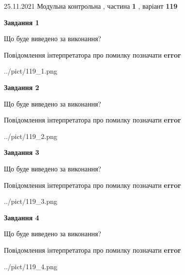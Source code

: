 \documentclass[10pt, ukrainian]{article}
\begin{document}
{25.11.2021 Модульна контрольна , частина \textbf { 1 }, варіант  \No \textbf { 119 }\par}
{
\begin {large}

{\begin {center}\textbf{Завдання 1}\end {center}}\par
Що буде виведено за виконання? \par
Повідомлення інтерпретатора про помилку позначати \textbf{error}

\begin{center}
	{../pict/119_1.png}
\end{center}
\newpage

{\begin {center}\textbf{Завдання 2}\end {center}}\par
Що буде виведено за виконання? \par
Повідомлення інтерпретатора про помилку позначати \textbf{error}

\begin{center}
	{../pict/119_2.png}
\end{center}
\newpage

{\begin {center}\textbf{Завдання 3}\end {center}}\par
Що буде виведено за виконання? \par
Повідомлення інтерпретатора про помилку позначати \textbf{error}

\begin{center}
	{../pict/119_3.png}
\end{center}
\newpage

{\begin {center}\textbf{Завдання 4}\end {center}}\par
Що буде виведено за виконання? \par
Повідомлення інтерпретатора про помилку позначати \textbf{error}

\begin{center}
	{../pict/119_4.png}
\end{center}
\newpage


\end{large}}
\end{document}
